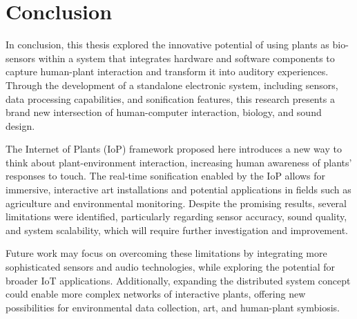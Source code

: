 \section{Conclusion}

In conclusion, this thesis explored the innovative potential of using plants as bio-sensors within a system that integrates hardware and software components to capture human-plant interaction and transform it into auditory experiences. Through the development of a standalone electronic system, including sensors, data processing capabilities, and sonification features, this research presents a brand new intersection of human-computer interaction, biology, and sound design.

The Internet of Plants (IoP) framework proposed here introduces a new way to think about plant-environment interaction, increasing human awareness of plants' responses to touch. The real-time sonification enabled by the IoP allows for immersive, interactive art installations and potential applications in fields such as agriculture and environmental monitoring. Despite the promising results, several limitations were identified, particularly regarding sensor accuracy, sound quality, and system scalability, which will require further investigation and improvement.

Future work may focus on overcoming these limitations by integrating more sophisticated sensors and audio technologies, while exploring the potential for broader IoT applications. Additionally, expanding the distributed system concept could enable more complex networks of interactive plants, offering new possibilities for environmental data collection, art, and human-plant symbiosis.